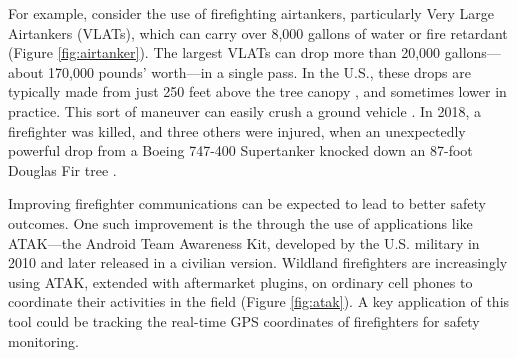 \documentclass[]             %
{NASA}                       %
\theoremstyle{definition}
\begin{document}
For example, consider the use of firefighting airtankers, particularly
Very Large Airtankers (VLATs), which can carry over 8,000 gallons of
water or fire retardant \cite{2019:airtankerops}
(Figure \ref{fig:airtanker}). The largest VLATs can drop more than
20,000 gallons---about 170,000 pounds' worth---in a single pass. In
the U.S., these drops are typically made from just 250 feet above the
tree canopy \cite{2019:airtankerops}, and sometimes lower in
practice. This sort of maneuver can easily crush a ground vehicle
\cite{2019:stickney}. In 2018, a firefighter was killed, and three
others were injured, when an unexpectedly powerful drop from a Boeing
747-400 Supertanker knocked down an 87-foot Douglas Fir tree
\cite{2018:calfire}.

Improving firefighter communications can be expected to lead to better
safety outcomes. One such improvement is the through the use of
applications like ATAK---the Android Team Awareness Kit, developed by
the U.S. military in 2010 and later released in a civilian
version. Wildland firefighters are increasingly using ATAK, extended
with aftermarket plugins, on ordinary cell phones to coordinate their
activities in the field (Figure \ref{fig:atak}). A key application of
this tool could be tracking the real-time GPS coordinates of
firefighters for safety monitoring.
\end{document}
